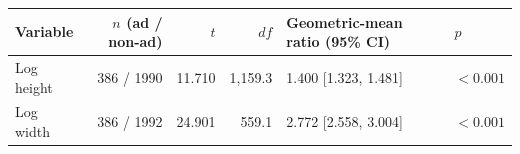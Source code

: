 \begin{tabular}{lrrrll}
\toprule
Variable & $n$ (ad / non-ad) & $t$ & $df$ & Geometric-mean ratio (95\% CI) & $p$
\\
\midrule
Log height & 386 / 1990 & 11.710 & 1,159.3 & 1.400 [1.323, 1.481] & $<0.001$
\\
Log width & 386 / 1992 & 24.901 & 559.1 & 2.772 [2.558, 3.004] & $<0.001$
\\
\bottomrule
\end{tabular}
